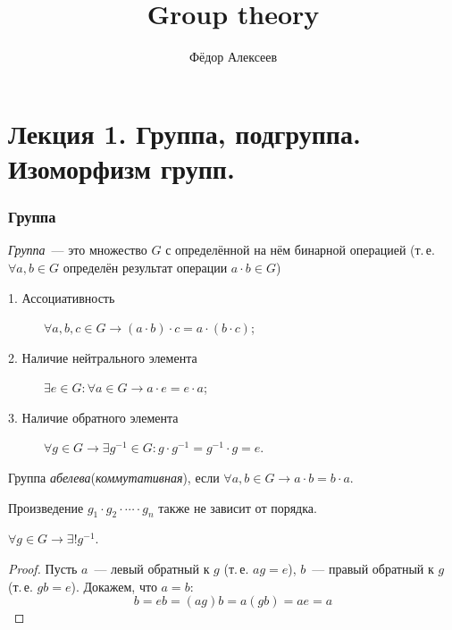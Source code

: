 



\title{Group theory}

\author{Фёдор Алексеев}

\maketitle
\tableofcontents\newpage{}

\part{Лекция 1. Группа, подгруппа. Изоморфизм групп.}
\section{Группа}
\begin{define*}
  \emph{Группа}~--- это множество $G$ с определённой на нём бинарной операцией (т.\,е. $\forall a, b \in G$ определён результат операции $a\cdot b \in G$)
  \begin{description}
	\item[1. Ассоциативность] $\forall a, b, c \in G \to (a\cdot b)\cdot c = a \cdot (b \cdot c)$;
	\item[2. Наличие нейтрального элемента] $\exists e \in G: \forall a \in G \to a\cdot e = e\cdot a$;
	\item[3. Наличие обратного элемента] $\forall g \in G \to \exists g^{-1} \in G: g\cdot g^{-1} = g^{-1}\cdot g = e$.
  \end{description}
  Группа \emph{абелева}(\emph{коммутативная}), если $\forall a, b \in G \to a\cdot b = b\cdot a$.
\end{define*}

\begin{remark*}
  Произведение $g_1 \cdot g_2 \cdot \cdots \cdot g_n$ также не зависит от порядка.
\end{remark*}

\begin{claim}
  $\forall g \in G \to \exists! g^{-1}$.
\end{claim}

\begin{proof}
  Пусть $a$~--- левый обратный к $g$ (т.\,е. $ag = e$),
  $b$~--- правый обратный к $g$ (т.\,е. $gb = e$). Докажем, что $a=b$:
  \begin{equation*}
	b = eb = (ag)b = a(gb) = ae = a
  \end{equation*}
\end{proof}

